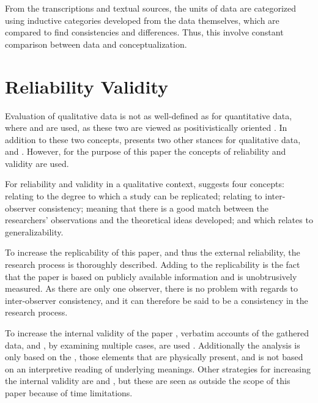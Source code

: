 From the transcriptions and textual sources, the units of data are categorized using inductive categories developed from the data themselves, which are compared to find consistencies and differences. Thus, this involve constant comparison between data and conceptualization.

\section{Reliability \oldand Validity}

Evaluation of qualitative data is not as well-defined as for quantitative data, where  and  are used, as these two are viewed as positivistically oriented \citep{bryman2008}. In addition to these two concepts, \citet{bryman2008} presents two other stances for qualitative data,  and . However, for the purpose of this paper the concepts of reliability and validity are used.

For reliability and validity in a qualitative context, \citet{bryman2008} suggests four concepts:  relating to the degree to which a study can be replicated;  relating to inter-observer consistency;  meaning that there is a good match between the researchers’ observations and the theoretical ideas developed; and  which relates to generalizability.

To increase the replicability of this paper, and thus the external reliability, the research process is thoroughly described. Adding to the replicability is the fact that the paper is based on publicly available information and is unobtrusively measured. As there are only one observer, there is no problem with regards to inter-observer consistency, and it can therefore be said to be a consistency in the research process.

To increase the internal validity of the paper , \eg verbatim accounts of the gathered data, and , \eg by examining multiple cases, are used \citep{johnson1997}. Additionally the analysis is only based on the , \ie those elements that are physically present, and is not based on an interpretive reading of underlying meanings. Other strategies for increasing the internal validity are  and , but these are seen as outside the scope of this paper because of time limitations.

